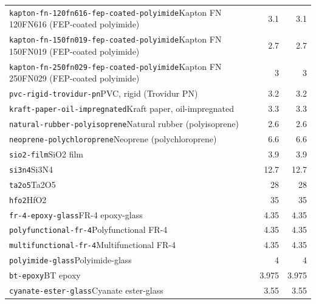 \begin{longtable}{@{}p{.69\linewidth}rr@{}}
\texttt{kapton-fn-120fn616-fep-coated-polyimide}\newline Kapton FN 120FN616 (FEP-coated polyimide) & 3.1 & 3.1\\[2pt]
\texttt{kapton-fn-150fn019-fep-coated-polyimide}\newline Kapton FN 150FN019 (FEP-coated polyimide) & 2.7 & 2.7\\[2pt]
\texttt{kapton-fn-250fn029-fep-coated-polyimide}\newline Kapton FN 250FN029 (FEP-coated polyimide) & 3 & 3\\[2pt]
\texttt{pvc-rigid-trovidur-pn}\newline PVC, rigid (Trovidur PN) & 3.2 & 3.2\\[2pt]
\texttt{kraft-paper-oil-impregnated}\newline Kraft paper, oil-impregnated & 3.3 & 3.3\\[2pt]
\texttt{natural-rubber-polyisoprene}\newline Natural rubber (polyisoprene) & 2.6 & 2.6\\[2pt]
\texttt{neoprene-polychloroprene}\newline Neoprene (polychloroprene) & 6.6 & 6.6\\[2pt]
\texttt{sio2-film}\newline SiO2 film & 3.9 & 3.9\\[2pt]
\texttt{si3n4}\newline Si3N4 & 12.7 & 12.7\\[2pt]
\texttt{ta2o5}\newline Ta2O5 & 28 & 28\\[2pt]
\texttt{hfo2}\newline HfO2 & 35 & 35\\[2pt]
\texttt{fr-4-epoxy-glass}\newline FR-4 epoxy-glass & 4.35 & 4.35\\[2pt]
\texttt{polyfunctional-fr-4}\newline Polyfunctional FR-4 & 4.35 & 4.35\\[2pt]
\texttt{multifunctional-fr-4}\newline Multifunctional FR-4 & 4.35 & 4.35\\[2pt]
\texttt{polyimide-glass}\newline Polyimide-glass & 4 & 4\\[2pt]
\texttt{bt-epoxy}\newline BT epoxy & 3.975 & 3.975\\[2pt]
\texttt{cyanate-ester-glass}\newline Cyanate ester-glass & 3.55 & 3.55\\[2pt]

\end{longtable}
